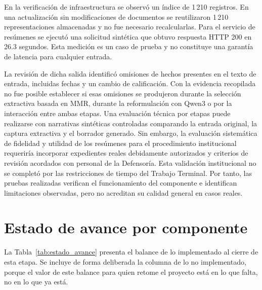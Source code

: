 En la verificación de infraestructura se observó un índice de 1\,210 registros.
En una actualización sin modificaciones de documentos se reutilizaron 1\,210
representaciones almacenadas y no fue necesario recalcularlas. Para el servicio
de resúmenes se ejecutó una solicitud sintética que obtuvo respuesta HTTP 200
en 26.3 segundos. Esta medición es un caso de prueba y no constituye una
garantía de latencia para cualquier entrada.

La revisión de dicha salida identificó omisiones de hechos presentes en el
texto de entrada, incluidas fechas y un cambio de calificación. Con la evidencia
recopilada no fue posible establecer si esas omisiones se produjeron durante la
selección extractiva basada en MMR, durante la reformulación con Qwen3 o por la
interacción entre ambas etapas. Una evaluación técnica por etapas puede realizarse
con narrativas sintéticas controladas comparando la entrada original, la captura
extractiva y el borrador generado. Sin embargo, la evaluación sistemática de
fidelidad y utilidad de los resúmenes para el procedimiento institucional
requeriría incorporar expedientes reales debidamente autorizados y criterios de
revisión acordados con personal de la Defensoría. Esta validación institucional no
se completó por las restricciones de tiempo del Trabajo Terminal. Por tanto,
las pruebas realizadas verifican el funcionamiento del componente e identifican
limitaciones observadas, pero no acreditan su calidad general en casos reales.


\section{Estado de avance por componente}
\label{sec:estado_avance}
La Tabla~\ref{tab:estado_avance} presenta el balance de lo implementado al cierre de esta etapa.
Se incluye de forma deliberada la columna de lo no implementado, porque el valor de este balance
para quien retome el proyecto está en lo que falta, no en lo que ya está.


\small
\renewcommand{\arraystretch}{1.25}
\setlength{\tabcolsep}{4pt}


